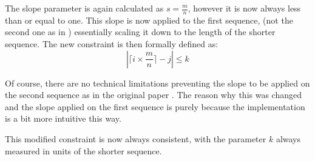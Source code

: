 \documentclass[parskip]{cs4rep}
\begin{document}
The slope parameter is again calculated as $s = \frac{m}{n}$, however it is now always less than or equal to one. This slope is now applied to the first sequence, (not the second one as in \citep{Giorgino:2009ue}) essentially scaling it down to the length of the shorter sequence.
The new constraint is then formally defined as:
\begin{equation}
|\lceil i \times \frac{m}{n} \rceil - j| \le k
\end{equation}

Of course, there are no technical limitations preventing the slope to be applied on the second sequence as in the original paper \cite{Giorgino:2009ue}. The reason why this was changed and the slope applied on the first sequence is purely because the implementation is a bit more intuitive this way. 

This modified constraint is now always consistent, with the parameter $k$ always measured in units of the shorter sequence.
\end{document}
